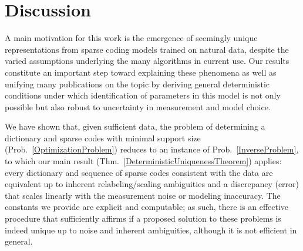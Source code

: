 \section{Discussion}\label{Discussion}

A main motivation for this work is the emergence of seemingly unique representations from sparse coding models trained on natural data, despite the varied assumptions underlying the many algorithms in current use. Our results constitute an important step toward explaining these phenomena as well as unifying many publications on the topic by deriving general deterministic conditions under which identification of parameters in this model is not only possible but also robust to uncertainty in measurement and model choice.

We have shown that, given sufficient data, the problem of determining a dictionary and sparse codes with minimal support size (Prob.~\ref{OptimizationProblem}) reduces to an instance of Prob.~\ref{InverseProblem}, to which our main result (Thm.~\ref{DeterministicUniquenessTheorem}) applies: every dictionary and sequence of sparse codes consistent with the data are equivalent up to inherent relabeling/scaling ambiguities and a discrepancy (error) that scales linearly with the measurement noise or modeling inaccuracy. The constants we provide are explicit and computable; as such, there is an effective procedure that sufficiently affirms if a proposed solution to these problems is indeed unique up to noise and inherent ambiguities, although it is not efficient in general.





